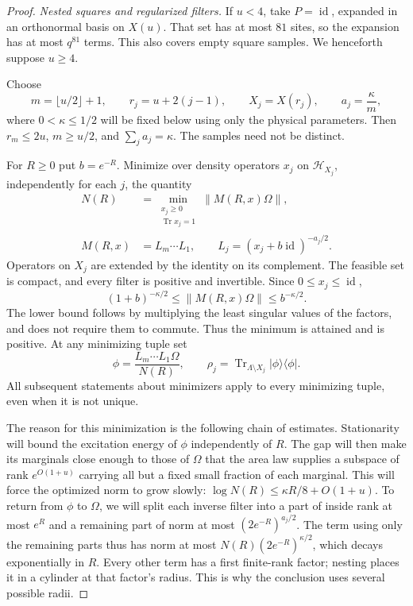 \documentclass[11pt]{article}
\numberwithin{equation}{section}
\theoremstyle{definition}
\theoremstyle{remark}
\DeclareMathOperator{\Tr}{Tr}
\DeclareMathOperator{\id}{id}
\newcommand{\norm}[1]{\lVert #1\rVert}
\begin{document}
\begin{proof}
\emph{Nested squares and regularized filters.}
If \(u<4\), take \(P=\id\), expanded in an orthonormal basis on
\(X(u)\).  That set has at most \(81\) sites, so the expansion has
at most \(q^{81}\) terms.  This also covers empty square samples.
We henceforth suppose \(u\geq4\).

Choose
\[
 m=\lfloor u/2\rfloor+1,\qquad
 r_j=u+2(j-1),\qquad X_j=X(r_j),\qquad
 a_j=\frac{\kappa}{m},
\]
where \(0<\kappa\leq1/2\) will be fixed below using only the physical
parameters.  Then \(r_m\leq2u\), \(m\geq u/2\), and
\(\sum_j a_j=\kappa\).  The samples need not be distinct.

For \(R\geq0\) put \(b=e^{-R}\).  Minimize over density operators
\(x_j\) on \(\mathcal H_{X_j}\), independently for each \(j\), the
quantity
\begin{equation}
 \begin{split}
 N(R)&=\min_{\substack{x_j\geq0\\ \Tr x_j=1}}
               \norm{M(R,x)\Omega},\\
 M(R,x)&=L_m\cdots L_1,\qquad
 L_j=(x_j+b\id)^{-a_j/2}.
 \end{split}
 \label{eq:patch-variational-problem}
\end{equation}
Operators on \(X_j\) are extended by the identity on its complement.
The feasible set is compact, and every filter is positive and
invertible.  Since \(0\leq x_j\leq\id\),
\begin{equation}
 (1+b)^{-\kappa/2}
       \leq \norm{M(R,x)\Omega}
       \leq b^{-\kappa/2}.
 \label{eq:patch-elementary-norm-bounds}
\end{equation}
The lower bound follows by multiplying the least singular values of
the factors, and does not require them to commute.  Thus the minimum
is attained and is positive.  At any minimizing tuple set
\[
 \phi=\frac{L_m\cdots L_1\Omega}{N(R)},
 \qquad
 \rho_j=\Tr_{\Lambda\setminus X_j}
                \lvert\phi\rangle\langle\phi\rvert .
\]
All subsequent statements about minimizers apply to every minimizing
tuple, even when it is not unique.

The reason for this minimization is the following chain of estimates.
Stationarity will bound the excitation energy of $\phi$ independently
of $R$.  The gap will then make its marginals close enough to those of
$\Omega$ that the area law supplies a subspace of rank $e^{O(1+u)}$
carrying all but a fixed small fraction of each marginal.  This will force
the optimized norm to grow slowly:
$\log N(R)\le \kappa R/8+O(1+u)$.
To return from $\phi$ to $\Omega$, we will split each inverse filter
into a part of inside rank at most $e^R$ and a remaining part of norm at
most $(2e^{-R})^{a_j/2}$.  The term using only the remaining parts thus
has norm at most $N(R)(2e^{-R})^{\kappa/2}$, which decays exponentially
in $R$.  Every other term has a first finite-rank factor; nesting places
it in a cylinder at that factor's radius.  This is why the conclusion
uses several possible radii.


\end{proof}
\end{document}
